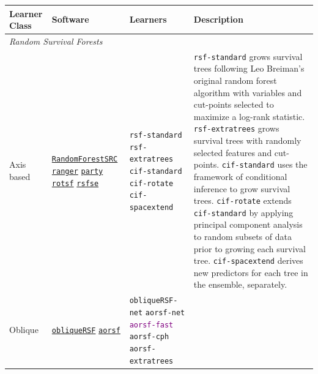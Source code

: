 \documentclass{article}\usepackage[]{graphicx}\usepackage[]{xcolor}
\begin{document}
\begin{landscape}

\begin{table}[h!]
\centering
\begin{tabular}{p{2cm} | p{3cm} p{4cm} p{12cm}}
 \hline
 Learner Class & Software & Learners & Description \\ [0.5ex]
 \hline\hline
 \multicolumn{3}{l}{\textit{Random Survival Forests}}\\
 \hline\hline

 Axis based &

 \href{https://www.randomforestsrc.org/index.html}{\texttt{RandomForestSRC}} \newline
 \href{https://CRAN.R-project.org/package=ranger}{\texttt{ranger}} \newline
 \href{http://party.r-forge.r-project.org/}{\texttt{party}} \newline
 \href{https://github.com/whcsu/rotsf}{\texttt{rotsf}} \newline
 \href{https://github.com/whcsu/rsfse}{\texttt{rsfse}} &

 \texttt{rsf-standard} \newline
 \texttt{rsf-extratrees} \newline
 \texttt{cif-standard} \newline
 \texttt{cif-rotate} \newline
 \texttt{cif-spacextend} &

 \texttt{rsf-standard} grows survival trees following Leo Breiman's original random forest algorithm with variables and cut-points selected to maximize a log-rank statistic. \texttt{rsf-extratrees} grows survival trees with randomly selected features and cut-points. \texttt{cif-standard} uses the framework of conditional inference to grow survival trees. \texttt{cif-rotate} extends \texttt{cif-standard} by applying principal component analysis to random subsets of data prior to growing each survival tree. \texttt{cif-spacextend} derives new predictors for each tree in the ensemble, separately. \\ \hline


 Oblique &


 \href{https://CRAN.R-project.org/package=obliqueRSF}{\texttt{obliqueRSF}} \newline
 \href{https://bcjaeger.github.io/aorsf/}{\texttt{aorsf}} &

 \texttt{obliqueRSF-net} \newline
 \texttt{aorsf-net} \newline
 \textcolor{purple}{\texttt{aorsf-fast}} \newline
 \texttt{aorsf-cph} \newline
 \texttt{aorsf-extratrees} &



\end{tabular}
\end{table}
\end{landscape}
\end{document}
